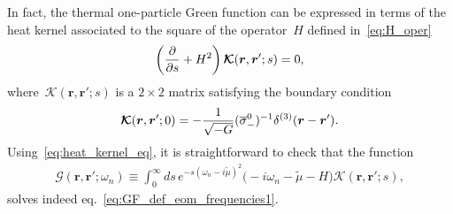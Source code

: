 \documentclass[11pt,a4paper]{article}
\begin{document}
In fact,
the thermal one-particle Green function can be expressed in terms of 
the heat kernel associated to the square of the operator~$H$ defined in~\eqref{eq:H_oper}
\begin{align}
\left({\partial\over\partial s}+H^{2}\right)\boldsymbol{\mathcal{K}}(\boldsymbol{r},\boldsymbol{r}';s)=0,
\label{eq:heat_kernel_eq}
\end{align}
where~$\boldsymbol{\mathcal{K}}(\boldsymbol{r},\boldsymbol{r}';s)$ is a $2\times 2$ matrix satisfying the 
boundary condition
\begin{align}
\boldsymbol{\mathcal{K}}(\boldsymbol{r},\boldsymbol{r}';0)
=-{1\over \sqrt{-G}}(\overline{\sigma}_{-}^{0})^{-1}\delta^{(3)}(\boldsymbol{r}-\boldsymbol{r}').
\label{eq:bdy_cond_kcal}
\end{align} 
Using~\eqref{eq:heat_kernel_eq}, it is straightforward to check that the function
\begin{align}
\boldsymbol{\mathcal{G}}(\boldsymbol{r},\boldsymbol{r'};\omega_{n})\equiv 
\int_{0}^{\infty}ds\,e^{-s(\omega_{n}-i\widetilde{\mu})^{2}}\big(-i\omega_{n}-\widetilde{\mu}
-H\big)\boldsymbol{\mathcal{K}}(\boldsymbol{r},\boldsymbol{r'};s),
\label{eq:green_function_nonzero_mu}
\end{align}
solves indeed eq.~\eqref{eq:GF_def_eom_frequencies1}.
\end{document}
